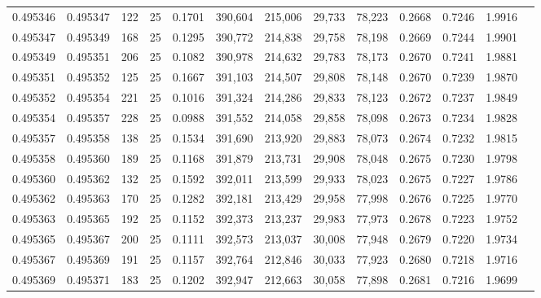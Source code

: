 \begin{tabular}{rrrrrrrrrrrrr}
0.495346 & 0.495347 &   122 &  25 &                                     0.1701 & 390,604 & 215,006 &  29,733 &  78,223 & 0.2668 & 0.7246 & 1.9916 \\
0.495347 & 0.495349 &   168 &  25 &                                     0.1295 & 390,772 & 214,838 &  29,758 &  78,198 & 0.2669 & 0.7244 & 1.9901 \\
0.495349 & 0.495351 &   206 &  25 &                                     0.1082 & 390,978 & 214,632 &  29,783 &  78,173 & 0.2670 & 0.7241 & 1.9881 \\
0.495351 & 0.495352 &   125 &  25 &                                     0.1667 & 391,103 & 214,507 &  29,808 &  78,148 & 0.2670 & 0.7239 & 1.9870 \\
0.495352 & 0.495354 &   221 &  25 &                                     0.1016 & 391,324 & 214,286 &  29,833 &  78,123 & 0.2672 & 0.7237 & 1.9849 \\
0.495354 & 0.495357 &   228 &  25 &                                     0.0988 & 391,552 & 214,058 &  29,858 &  78,098 & 0.2673 & 0.7234 & 1.9828 \\
0.495357 & 0.495358 &   138 &  25 &                                     0.1534 & 391,690 & 213,920 &  29,883 &  78,073 & 0.2674 & 0.7232 & 1.9815 \\
0.495358 & 0.495360 &   189 &  25 &                                     0.1168 & 391,879 & 213,731 &  29,908 &  78,048 & 0.2675 & 0.7230 & 1.9798 \\
0.495360 & 0.495362 &   132 &  25 &                                     0.1592 & 392,011 & 213,599 &  29,933 &  78,023 & 0.2675 & 0.7227 & 1.9786 \\
0.495362 & 0.495363 &   170 &  25 &                                     0.1282 & 392,181 & 213,429 &  29,958 &  77,998 & 0.2676 & 0.7225 & 1.9770 \\
0.495363 & 0.495365 &   192 &  25 &                                     0.1152 & 392,373 & 213,237 &  29,983 &  77,973 & 0.2678 & 0.7223 & 1.9752 \\
0.495365 & 0.495367 &   200 &  25 &                                     0.1111 & 392,573 & 213,037 &  30,008 &  77,948 & 0.2679 & 0.7220 & 1.9734 \\
0.495367 & 0.495369 &   191 &  25 &                                     0.1157 & 392,764 & 212,846 &  30,033 &  77,923 & 0.2680 & 0.7218 & 1.9716 \\
0.495369 & 0.495371 &   183 &  25 &                                     0.1202 & 392,947 & 212,663 &  30,058 &  77,898 & 0.2681 & 0.7216 & 1.9699 \\

\end{tabular}
